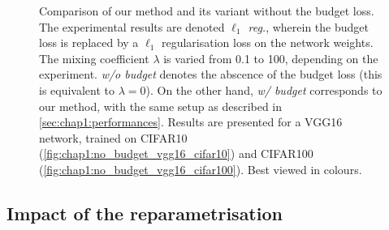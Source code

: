 \begin{figure}
  \centering
    \caption{ Comparison of our method and its variant without the budget loss.
    The experimental results are denoted \emph{$\ell_1$ reg.}, wherein the budget
    loss is replaced by a $\ell_1$ regularisation loss on the network weights. The
    mixing coefficient $\lambda$ is varied from 0.1 to 100, depending on the
    experiment. \emph{w/o budget} denotes the abscence of the budget loss (this
    is equivalent to $\lambda = 0$). On the other hand, \emph{w/ budget}
    corresponds to our method, with the same setup as described in
    \cref{sec:chap1:performances}. Results are presented for a VGG16 network,
    trained on CIFAR10 (\cref{fig:chap1:no_budget_vgg16_cifar10}) and CIFAR100
    (\cref{fig:chap1:no_budget_vgg16_cifar100}). Best viewed in colours.}       
    \label{fig:chap1:no_budget_vgg16}
\end{figure}



\subsection{Impact of the reparametrisation}
\label{sec:chap1:impact_of_reparametrisation}

